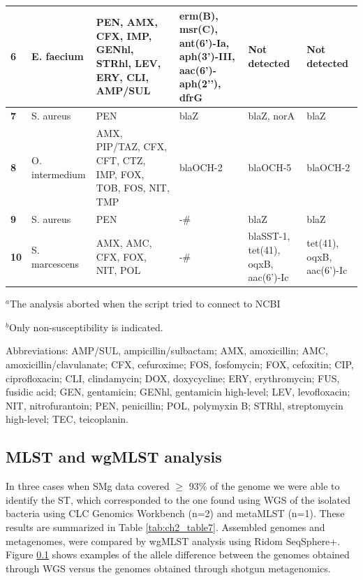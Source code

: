 \begin{table}[]
{\begin{tabular}{@{}|l|l|l|l|ll|@{}}
\textbf{6} &
  E. faecium &
  PEN, AMX, CFX, IMP, GENhl, STRhl, LEV, ERY, CLI, AMP/SUL &
  erm(B), msr(C), ant(6’)-Ia, aph(3’)-III, aac(6’)-aph(2’’), dfrG &
  \multicolumn{1}{l|}{Not detected} &
  Not detected \\ \midrule
\textbf{7} &
  S. aureus &
  PEN &
  blaZ &
  \multicolumn{1}{l|}{blaZ, norA} &
  blaZ \\ \midrule
\textbf{8} &
  O. intermedium &
  AMX, PIP/TAZ, CFX, CFT, CTZ, IMP, FOX, TOB, FOS, NIT, TMP &
  blaOCH-2 &
  \multicolumn{1}{l|}{blaOCH-5} &
  blaOCH-2 \\ \midrule
\textbf{9} &
  S. aureus &
  PEN &
  -\# &
  \multicolumn{1}{l|}{blaZ} &
  blaZ \\ \midrule
\textbf{10} &
  S. marcescens &
  AMX, AMC, CFX, FOX, NIT, POL &
  -\# &
  \multicolumn{1}{l|}{blaSST-1, tet(41), oqxB, aac(6’)-Ic} &
  tet(41), oqxB, aac(6’)-Ic \\ \bottomrule
\end{tabular}%
}
\item $^a$The analysis aborted when the script tried to connect to NCBI
\item $^b$Only non-susceptibility is indicated. \item Abbreviations: AMP/SUL, ampicillin/sulbactam; AMX, amoxicillin; AMC, amoxicillin/clavulanate; CFX, cefuroxime; FOS, fosfomycin; FOX, cefoxitin; CIP, ciprofloxacin; CLI, clindamycin; DOX, doxycycline; ERY, erythromycin; FUS, fusidic acid; GEN, gentamicin; GENhl, gentamicin high-level; LEV, levofloxacin; NIT, nitrofurantoin; PEN, penicillin; POL, polymyxin B; STRhl, streptomycin high-level; TEC, teicoplanin.
\end{table}

\subsection{MLST and wgMLST analysis}
 

In three cases when SMg data covered $\geq$ 93\% of the genome we were able to identify the ST, which corresponded to the one found using WGS of the isolated bacteria using CLC Genomics Workbench (n=2) and metaMLST (n=1). 
These results are summarized in Table \ref{tab:ch2_table7}.
Assembled genomes and metagenomes, were compared by wgMLST analysis using Ridom SeqSphere+. 
Figure \ref{} shows examples of the allele difference between the genomes obtained through WGS versus the genomes obtained through shotgun metagenomics.

